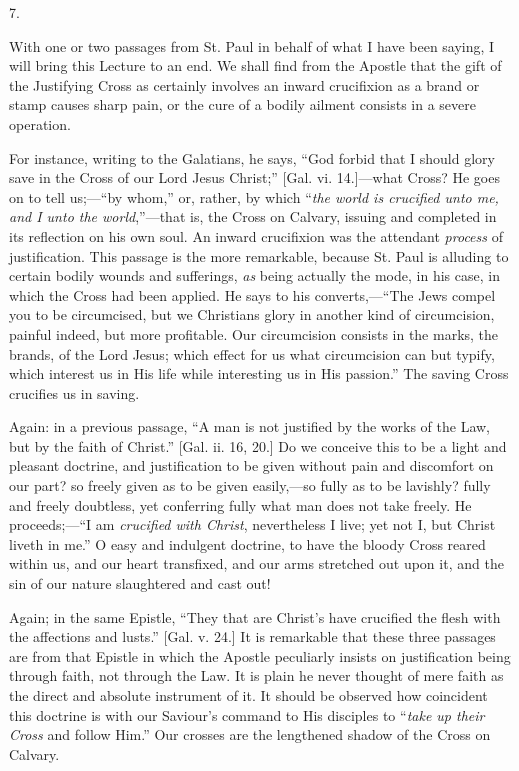 7.

With one or two passages from St. Paul in behalf of what I have
been saying, I will bring this Lecture to an end. We shall find from
the Apostle that the gift of the Justifying Cross as certainly
involves an inward crucifixion as a brand or stamp causes sharp pain,
or the cure of a bodily ailment consists in a severe operation.

For instance, writing to the Galatians, he says, ``God forbid
that I should glory save in the Cross of our Lord Jesus Christ;''
[Gal. vi. 14.]—what Cross? He goes on to tell us;—``by
whom,'' or, rather, by which ``\emph{the world is crucified unto
me, and I unto the world},''—that is, the Cross on Calvary,
issuing and completed in its reflection on his own soul. An inward
crucifixion was the attendant \emph{process} of justification. This
passage is the more remarkable, because St. Paul is alluding to
certain bodily wounds and sufferings, \emph{as} being actually the
mode, in his case, in which the Cross had been applied. He says to his
converts,—``The Jews compel you to be circumcised, but we
Christians glory in another kind of circumcision, painful indeed, but
more profitable. Our circumcision consists in the marks, the brands,
of the Lord Jesus; which effect for us what circumcision can but
typify, which interest us in His life while interesting us in His
passion.'' The saving Cross crucifies us in saving.

Again: in a previous passage, ``A man is not justified by the
works of the Law, but by the faith of Christ.'' [Gal. ii. 16, 20.]
Do we conceive this to be a light and pleasant doctrine, and
justification to be given without pain and discomfort on our part? so
freely given as to be given easily,—so fully as to be
lavishly? fully and freely doubtless, yet conferring fully what man
does not take freely. He proceeds;—``I am \emph{crucified with
Christ}, nevertheless I live; yet not I, but Christ liveth in
me.'' O easy and indulgent doctrine, to have the bloody Cross
reared within us, and our heart transfixed, and our arms stretched out
upon it, and the sin of our nature slaughtered and cast out!

Again; in the same Epistle, ``They that are Christ's have
crucified the flesh with the affections and lusts.'' [Gal. v. 24.]
It is remarkable that these three passages are from that Epistle in
which the Apostle peculiarly insists on justification being through
faith, not through the Law. It is plain he never thought of mere faith
as the direct and absolute instrument of it. It should be observed how
coincident this doctrine is with our Saviour's command to His
disciples to ``\emph{take up their Cross} and follow Him.''
Our crosses are the lengthened shadow of the Cross on Calvary.

